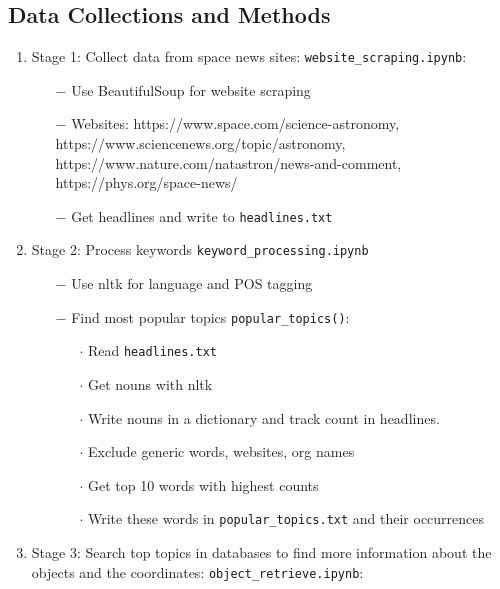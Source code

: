 \documentclass[12pt,letterpaper]{article}
\begin{document}
\subsection*{Data Collections and Methods}
\begin{enumerate}[leftmargin=*]
    \item Stage 1: Collect data from space news sites:  \texttt{website\_scraping.ipynb}:
        \begin{enumerate}
            \item [$-$] Use BeautifulSoup for website scraping
            \item [$-$] Websites: https://www.space.com/science-astronomy, \\
            https://www.sciencenews.org/topic/astronomy, \\ 
            https://www.nature.com/natastron/news-and-comment, \\ 
            https://phys.org/space-news/
            \item [$-$] Get headlines and write to \texttt{headlines.txt}
        \end{enumerate}
    \item Stage 2: Process keywords \texttt{keyword\_processing.ipynb}
        \begin{enumerate}
            \item [$-$] Use nltk for language and POS tagging
            \item [$-$] Find most popular topics \texttt{popular\_topics()}:
            \begin{enumerate}[leftmargin=*]
                \item[$\cdot$] Read \texttt{headlines.txt}
                \item[$\cdot$]Get nouns with nltk
                \item[$\cdot$]Write nouns in a dictionary and track count in headlines.
                \item[$\cdot$]Exclude generic words, websites, org names
                \item[$\cdot$]Get top 10 words with highest counts
                \item[$\cdot$]Write these words in \texttt{popular\_topics.txt} and their occurrences
            \end{enumerate}
        \end{enumerate}
    \item Stage 3: Search top topics in databases to find more information 
    about the objects and the coordinates: \texttt{object\_retrieve.ipynb}:

\end{enumerate}
\end{document}
